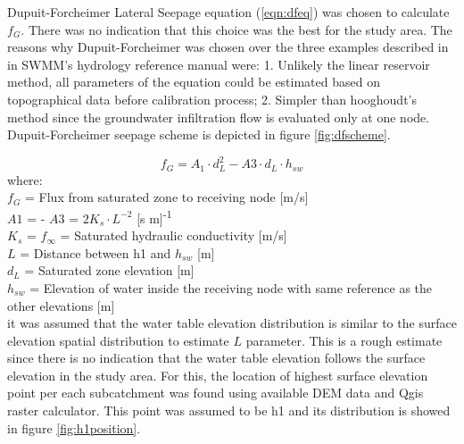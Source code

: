 Dupuit-Forcheimer Lateral Seepage equation (\ref{eqn:dfeq}) was chosen to calculate $f_G$. There was no indication that this choice was the best for the study area. The reasons why Dupuit-Forcheimer was chosen over the three examples described in in SWMM's hydrology reference manual \cite{Rossman2016} were:  1. Unlikely the linear reservoir method, all parameters of the equation could be estimated based on topographical data before calibration process; 2. Simpler than hooghoudt's method since the groundwater infiltration flow is evaluated only at one node. Dupuit-Forcheimer seepage scheme is depicted in figure \ref{fig:dfscheme}.



\begin{equation}
\label{eqn:dfeq}
f_G = A_1 \cdot d^2_L - A3 \cdot d_L\cdot h_{sw}
\end{equation}
where: \\
\indent $f_G$ = Flux from saturated zone to receiving node [m/s] \\
\indent $A1$ = - $A3$ = $2K_s \cdot L^{-2}$ [s m]\textsuperscript{-1}\\
\indent $K_s$ = $f_\infty$ = Saturated hydraulic conductivity [m/s]\\
\indent $L$ = Distance between h1 and $h_{sw}$ [m]\\
\indent $d_L$ = Saturated zone elevation [m]\\
\indent $h_{sw}$ =  Elevation of water inside the receiving node with same reference as the other elevations [m]\\


it was assumed that the water table elevation distribution is similar to the surface elevation spatial distribution to estimate $L$ parameter. This is a rough estimate since there is no indication that the water table elevation follows the surface elevation in the study area. For this, the location of highest surface elevation point per each subcatchment was found using available DEM data and Qgis raster calculator. This point was assumed to be h1 and its distribution is showed in figure \ref{fig:h1position}.

